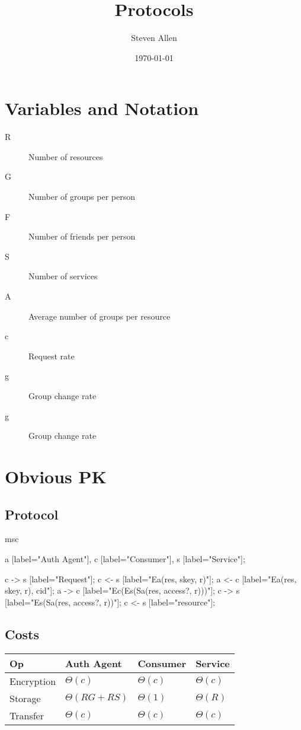 \documentclass[pdftex,12pt,a4papaer]{article}
\author{Steven Allen}
\date{\today}
\title{Protocols}
\begin{document}
\maketitle

\hfill

\section{Variables and Notation}


\begin{description}
    \item[R] Number of resources
    \item[G] Number of groups per person
    \item[F] Number of friends per person
    \item[S] Number of services
    \item[A] Average number of groups per resource
    \item[c] Request rate
    \item[g] Group change rate
    \item[g] Group change rate
\end{description}

\pagebreak

\section{Obvious PK} %

\subsection{Protocol}

\begin{msc}
msc {
    a [label="Auth Agent"],
    c [label="Consumer"],
    s [label="Service"];

    c -> s [label="Request"];
    c <- s [label="Ea(res, skey, r)"];
    a <- c [label="Ea(res, skey, r), cid"];
    a -> c [label="Ec(Es(Sa(res, access?, r)))"];
    c -> s [label="Es(Sa(res, access?, r))"];
    c <- s [label="resource"];
}
\end{msc}

\subsection{Costs}

\begin{tabular}{l|l|l|l}
 Op & Auth Agent & Consumer & Service \\ \hline
 Encryption & $\Theta(c)$ & $\Theta(c)$ & $\Theta(c)$ \\
    Storage & $\Theta(RG+RS)$ & $\Theta(1)$ & $\Theta(R)$ \\
    Transfer & $\Theta(c)$ & $\Theta(c)$ & $\Theta(c)$
\end{tabular}
\end{document}
